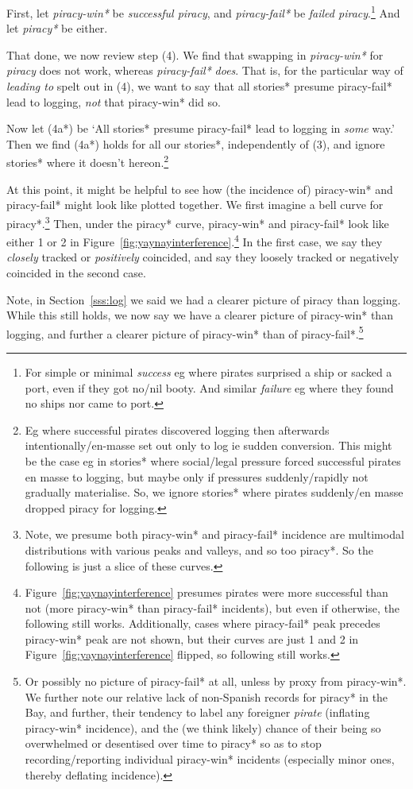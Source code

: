 \documentclass{amsart}
\newcommand{\ment}[1]{\textit{#1}} %
\theoremstyle{definition}
\theoremstyle{remark}
\begin{document}
		First, let \ment{piracy-win*} be \ment{successful piracy}, and \ment{piracy-fail*} be \ment{failed piracy}.\footnote{For simple or minimal \ment{success} eg where pirates surprised a ship or sacked a port, even if they got no/nil booty. And similar \ment{failure} eg where they found no ships nor came to port.} And let \ment{piracy*} be either.
		
		That done, we now review step (4). We find that swapping in \ment{piracy-win*} for \ment{piracy} does not work, whereas \ment{piracy-fail*} \emph{does}. That is, for the particular way of \ment{leading to} spelt out in (4), we want to say that all stories* presume piracy-fail* lead to logging, \emph{not} that piracy-win* did so.
		
		Now let (4a*) be `All stories* presume piracy-fail* lead to logging in \emph{some} way.' Then we find (4a*) holds for all our stories*, independently of (3), and ignore stories* where it doesn't hereon.\footnote{Eg where successful pirates discovered logging then afterwards intentionally/en-masse set out only to log ie sudden conversion. This might be the case eg in stories* where social/legal pressure forced successful pirates en masse to logging, but maybe only if pressures suddenly/rapidly not gradually materialise. So, we ignore stories* where pirates suddenly/en masse dropped piracy for logging.}
		
		At this point, it might be helpful to see how (the incidence of) piracy-win* and piracy-fail* might look like plotted together. We first imagine a bell curve for piracy*.\footnote{Note, we presume both piracy-win* and piracy-fail* incidence are multimodal distributions with various peaks and valleys, and so too piracy*. So the following is just a slice of these curves.} Then, under the piracy* curve, piracy-win* and piracy-fail* look like either 1 or 2 in Figure~\ref{fig:yaynayinterference}.\footnote{Figure~\ref{fig:yaynayinterference} presumes pirates were more successful than not (more piracy-win* than piracy-fail* incidents), but even if otherwise, the following still works. Additionally, cases where piracy-fail* peak precedes piracy-win* peak are not shown, but their curves are just 1 and 2 in Figure~\ref{fig:yaynayinterference} flipped, so following still works.} In the first case, we say they \emph{closely} tracked or \emph{positively} coincided, and say they loosely tracked or negatively coincided in the second case.
		
		Note, in Section~\ref{sss:log} we said we had a clearer picture of piracy than logging. While this still holds, we now say we have a clearer picture of piracy-win* than logging, and further a clearer picture of piracy-win* than of piracy-fail*.\footnote{Or possibly no picture of piracy-fail* at all, unless by proxy from piracy-win*. We further note our relative lack of non-Spanish records for piracy* in the Bay, and further, their tendency to label any foreigner \ment{pirate} (inflating piracy-win* incidence), and the (we think likely) chance of their being so overwhelmed or desentised over time to piracy* so as to stop recording/reporting individual piracy-win* incidents (especially minor ones, thereby deflating incidence).}
		
\end{document}
